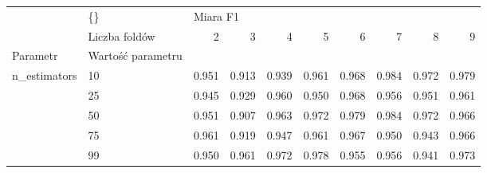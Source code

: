\begin{tabular}{llrrrrrrrr}
\hline
             & \{\} & \multicolumn{8}{l}{Miara F1} \\
             & Liczba foldów &        2 &      3 &      4 &      5 &      6 &      7 &      8 &      9 \\
Parametr & Wartość parametru &          &        &        &        &        &        &        &        \\
\hline
n\_estimators & 10 &    0.951 &  0.913 &  0.939 &  0.961 &  0.968 &  0.984 &  0.972 &  0.979 \\
             & 25 &    0.945 &  0.929 &  0.960 &  0.950 &  0.968 &  0.956 &  0.951 &  0.961 \\
             & 50 &    0.951 &  0.907 &  0.963 &  0.972 &  0.979 &  0.984 &  0.972 &  0.966 \\
             & 75 &    0.961 &  0.919 &  0.947 &  0.961 &  0.967 &  0.950 &  0.943 &  0.966 \\
             & 99 &    0.950 &  0.961 &  0.972 &  0.978 &  0.955 &  0.956 &  0.941 &  0.973 \\
\hline
\end{tabular}

